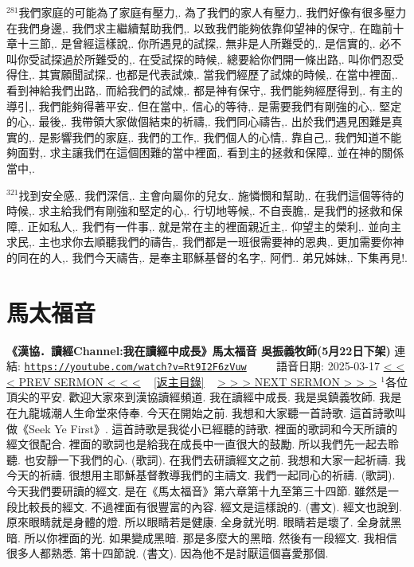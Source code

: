\documentclass{book}
\begin{document}
$^{281}$我們家庭的可能為了家庭有壓力,.
為了我們的家人有壓力,.
我們好像有很多壓力在我們身邊,.
我們求主繼續幫助我們,.
以致我們能夠依靠仰望神的保守,.
在臨前十章十三節,.
是曾經這樣說,.
你所遇見的試探,.
無非是人所難受的,.
是信實的,.
必不叫你受試探過於所難受的,.
在受試探的時候,.
總要給你們開一條出路,.
叫你們忍受得住,.
其實願聞試探,.
也都是代表試煉,.
當我們經歷了試煉的時候,.
在當中裡面,.
看到神給我們出路,.
而給我們的試煉,.
都是神有保守,.
我們能夠經歷得到,.
有主的導引,.
我們能夠得著平安,.
但在當中,.
信心的等待,.
是需要我們有剛強的心,.
堅定的心,.
最後,.
我帶領大家做個結束的祈禱,.
我們同心禱告,.
出於我們遇見困難是真實的,.
是影響我們的家庭,.
我們的工作,.
我們個人的心情,.
靠自己,.
我們知道不能夠面對,.
求主讓我們在這個困難的當中裡面,.
看到主的拯救和保障,.
並在神的關係當中,.

$^{321}$找到安全感,.
我們深信,.
主會向屬你的兒女,.
施憐憫和幫助,.
在我們這個等待的時候,.
求主給我們有剛強和堅定的心,.
行切地等候,.
不自喪膽,.
是我們的拯救和保障,.
正如私人,.
我們有一件事,.
就是常在主的裡面親近主,.
仰望主的榮利,.
並向主求民,.
主也求你去順聽我們的禱告,.
我們都是一班很需要神的恩典,.
更加需要你神的同在的人,.
我們今天禱告,.
是奉主耶穌基督的名字,.
阿們..
弟兄姊妹,.
下集再見!.
\newpage



\section{馬太福音}
\label{sec:Rt9I2F6zVuw}
\textbf{《漢協．讀經Channel:我在讀經中成長》馬太福音 吳振義牧師(5月22日下架)}
\newline
\newline
連結: \href{https://youtube.com/watch?v=Rt9I2F6zVuw}{\texttt{https://youtube.com/watch?v=Rt9I2F6zVuw}} ~~~~ 語音日期: 2025-03-17
\newline
\newline
\hyperref[sec:8MeYWz2C9Es]{\small{< < < PREV SERMON < < <}}
~
\hyperref[sec:index]{\small{[返主目錄]}}
~
\hyperref[sec:GZC4IF6Mp8U]{\small{> > > NEXT SERMON > > >}}
\newline
\newline
$^{1}$各位頂尖的平安.
歡迎大家來到漢協讀經頻道.
我在讀經中成長.
我是吳鎮義牧師.
我是在九龍城潮人生命堂來侍奉.
今天在開始之前.
我想和大家聽一首詩歌.
這首詩歌叫做《Seek Ye First》.
這首詩歌是我從小已經聽的詩歌.
裡面的歌詞和今天所讀的經文很配合.
裡面的歌詞也是給我在成長中一直很大的鼓勵.
所以我們先一起去聆聽.
也安靜一下我們的心.
(歌詞).
在我們去研讀經文之前.
我想和大家一起祈禱.
我今天的祈禱.
很想用主耶穌基督教導我們的主禱文.
我們一起同心的祈禱.
(歌詞).
今天我們要研讀的經文.
是在《馬太福音》第六章第十九至第三十四節.
雖然是一段比較長的經文.
不過裡面有很豐富的內容.
經文是這樣說的.
(書文).
經文也說到.
原來眼睛就是身體的燈.
所以眼睛若是健康.
全身就光明.
眼睛若是壞了.
全身就黑暗.
所以你裡面的光.
如果變成黑暗.
那是多麼大的黑暗.
然後有一段經文.
我相信很多人都熟悉.
第十四節說.
(書文).
因為他不是討厭這個喜愛那個.
\end{document}
